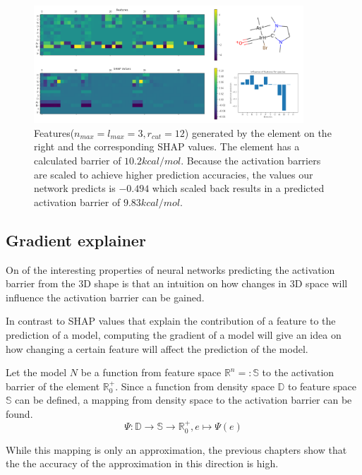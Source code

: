 \begin{figure}
    \centering
    \includegraphics[width=0.9\textwidth]{figures/evaluation/SHAP.png}
    \caption[SHAP values]{
        Features($n_{max}=l_{max}=3, r_{cut}=12$) generated by the element on the right and the corresponding SHAP values.
        The element has a calculated barrier of $10.2 kcal/mol$.
        Because the activation barriers are scaled to achieve higher prediction accuracies,
        the values our network predicts is $-0.494$ which scaled back results in a predicted activation 
        barrier of $9.83 kcal/mol$.
     }
    \label{fig:shap}
  \end{figure}
  



\subsection{Gradient explainer}

On  of the interesting properties of neural networks predicting the activation barrier from the 3D shape is 
that an intuition on how changes in 3D space will influence the activation barrier can be gained.

In contrast to SHAP values that explain the contribution of a feature to the prediction of a model, 
computing the gradient of a model will give an idea on how changing a certain feature will affect the prediction of the model.

Let the model $N$ be a function from feature space $\mathbb{R}^n =: \mathbb{S}$ to the activation barrier of the element $\mathbb{R}^+_0$.
Since a function from density space $\mathbb{D}$ to feature space $\mathbb{S}$ can be defined,
a mapping from density space to the activation barrier can be found.
$$ \Psi : \mathbb{D} \to \mathbb{S} \to \mathbb{R}^+_0, e \mapsto \Psi(e) $$

While this mapping is only an approximation, the previous chapters show that the 
the accuracy of the approximation in this direction is high.

